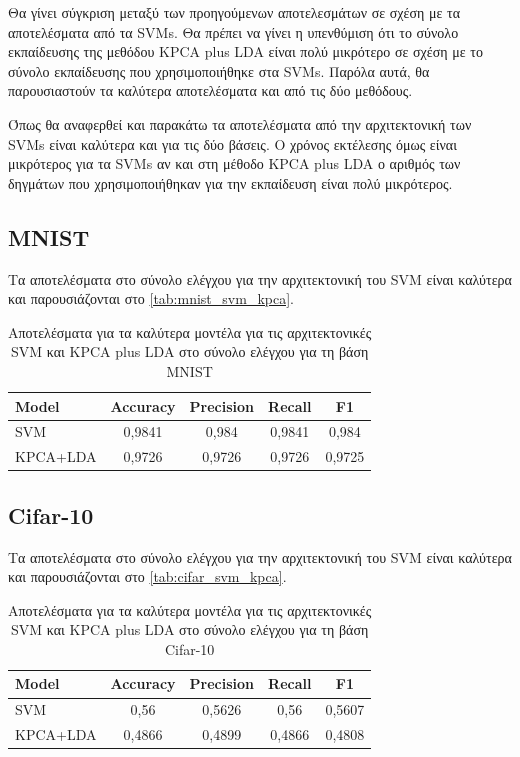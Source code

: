 \documentclass[a4paper]{article}
\begin{document}
Θα γίνει σύγκριση μεταξύ των προηγούμενων αποτελεσμάτων σε σχέση με τα
αποτελέσματα από τα SVMs. Θα πρέπει να γίνει η υπενθύμιση ότι το σύνολο
εκπαίδευσης της μεθόδου KPCA plus LDA είναι πολύ μικρότερο σε σχέση με το σύνολο
εκπαίδευσης που χρησιμοποιήθηκε στα SVMs. Παρόλα αυτά, θα παρουσιαστούν τα
καλύτερα αποτελέσματα και από τις δύο μεθόδους.

Όπως θα αναφερθεί και παρακάτω τα αποτελέσματα από την αρχιτεκτονική των SVMs
είναι καλύτερα και για τις δύο βάσεις. Ο χρόνος εκτέλεσης όμως είναι μικρότερος
για τα SVMs αν και στη μέθοδο KPCA plus LDA ο αριθμός των δηγμάτων που
χρησιμοποιήθηκαν για την εκπαίδευση είναι πολύ μικρότερος.

\subsection{MNIST}

Τα αποτελέσματα στο σύνολο ελέγχου για την αρχιτεκτονική του SVM είναι καλύτερα
και παρουσιάζονται στο \autoref{tab:mnist_svm_kpca}.

\begin{table}[H]
\centering
\begin{tabular}{|l|c|c|c|c|}
\hline
\textbf{Model} & \textbf{Accuracy} & \textbf{Precision} & \textbf{Recall} & \textbf{F1}\\ \hline
SVM & 0,9841 & 0,984 & 0,9841 & 0,984\\ \hline
KPCA+LDA & 0,9726 & 0,9726 & 0,9726 & 0,9725 \\ \hline
\end{tabular}
\caption{Αποτελέσματα για τα καλύτερα μοντέλα για τις αρχιτεκτονικές SVM και
    KPCA plus LDA στο σύνολο ελέγχου για τη βάση MNIST}
\label{tab:mnist_svm_kpca}
\end{table}

\subsection{Cifar-10}

Τα αποτελέσματα στο σύνολο ελέγχου για την αρχιτεκτονική του SVM είναι καλύτερα
και παρουσιάζονται στο \autoref{tab:cifar_svm_kpca}.

\begin{table}[H]
\centering
\begin{tabular}{|l|c|c|c|c|}
\hline
\textbf{Model} & \textbf{Accuracy} & \textbf{Precision} & \textbf{Recall} & \textbf{F1}\\ \hline
SVM & 0,56 & 0,5626 & 0,56 & 0,5607\\ \hline
KPCA+LDA & 0,4866 & 0,4899 & 0,4866 & 0,4808\\ \hline
\end{tabular}
\caption{Αποτελέσματα για τα καλύτερα μοντέλα για τις αρχιτεκτονικές SVM και
    KPCA plus LDA στο σύνολο ελέγχου για τη βάση Cifar-10}
\label{tab:cifar_svm_kpca}
\end{table}

\newpage
\begin{english}
\printbibliography[title=Βιβλιογραφία]
\end{english}
\end{document}
